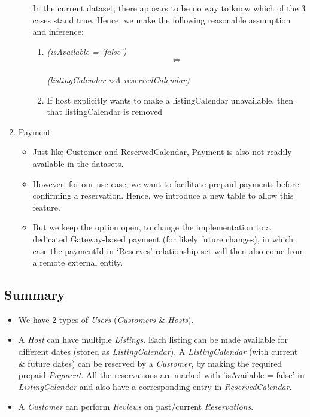 \documentclass[conference]{IEEEtran}
\begin{document}
\begin{enumerate}
\begin{itemize}
                    In the current dataset, there appears to be no way to know which of the 3 cases stand true. Hence, we make the following reasonable assumption and inference:
                        \begin{enumerate}
			  \item \textit{(isAvailable = ‘false’)} 
                                    \vspace{-7mm}
                                \[\Leftrightarrow \] \\
                                
                                    \vspace{-12mm}
                                \textit{(listingCalendar  isA  reservedCalendar)} 

                            \item If host explicitly wants to make a listingCalendar unavailable, then that listingCalendar is removed
                        \end{enumerate}
            \end{itemize}

	\item Payment
	    \begin{itemize}
	       \item Just like Customer and ReservedCalendar, Payment is also not readily available in the datasets.
	       \item However, for our use-case, we want to facilitate prepaid payments before confirming a reservation. Hence, we introduce a new table to allow this feature.
	       \item But we keep the option open, to change the implementation to a dedicated Gateway-based payment (for likely future changes), in which case the paymentId in ‘Reserves’ relationship-set will then also come from a remote external entity.
    	   \end{itemize}
     \end{enumerate}

    \vspace{-2mm}
 
   \subsection{\textbf{Summary}}
	   \begin{itemize}
	       \item We have 2 types of \textit{Users} (\textit{Customers} \& \textit{Hosts}).
	       \item A \textit{Host} can have multiple \textit{Listings}. Each listing can be made available for different dates (stored as \textit{ListingCalendar}). A \textit{ListingCalendar} (with current \& future dates) can be reserved by a \textit{Customer}, by making the required prepaid \textit{Payment}. All the reservations are marked with 'isAvailable = false' in \textit{ListingCalendar} and also have a corresponding entry in \textit{ReservedCalendar}.
	       \item A \textit{Customer} can perform \textit{Reviews} on past/current \textit{Reservations}.
    	   \end{itemize}
\end{document}
